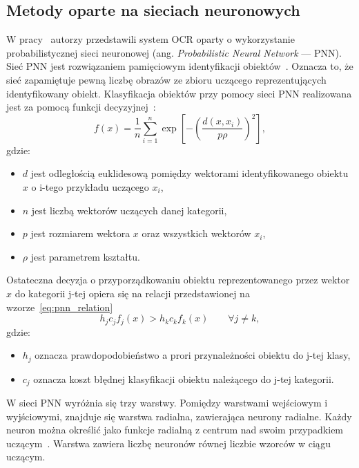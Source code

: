\subsection{Metody oparte na sieciach neuronowych}
\label{subsec:neural_networks}
W pracy~\cite{1688109} autorzy przedstawili system OCR oparty o wykorzystanie probabilistycznej sieci neuronowej (ang. \textit{Probabilistic Neural Network } --- PNN).
Sieć PNN jest rozwiązaniem pamięciowym identyfikacji obiektów~\cite{Praczyk_2011}.
Oznacza to, że sieć zapamiętuje pewną liczbę obrazów ze zbioru uczącego reprezentujących identyfikowany obiekt.
Klasyfikacja obiektów przy pomocy sieci PNN realizowana jest za pomocą funkcji decyzyjnej~\cite{SPECHT1990109}:
\begin{equation}
    \label{eq:pnn_network}
    f(x)=\dfrac{1}{n}\sum_{i=1}^{n}\exp\left[ -\left( \dfrac{d(x,x_i)}{p\rho} \right)^2 \right],
\end{equation}
gdzie:
\begin{itemize}
    \item $d$ jest odległością euklidesową pomiędzy wektorami identyfikowanego obiektu $x$ o i-tego przykładu uczącego $x_i$,
    \item $n$ jest liczbą wektorów uczących danej kategorii,
    \item $p$ jest rozmiarem wektora $x$ oraz wszystkich wektorów $x_i$,
    \item $\rho$ jest parametrem kształtu.
\end{itemize}
Ostateczna decyzja o przyporządkowaniu obiektu reprezentowanego przez wektor $x$ do kategorii j-tej opiera się na relacji przedstawionej na wzorze~\eqref{eq:pnn_relation}~\cite{Praczyk_2011}
\begin{equation}
    \label{eq:pnn_relation}
    h_j c_j f_j(x) > h_k c_k f_k(x) \qquad \forall j\neq k,
\end{equation}
gdzie:
\begin{itemize}
    \item $h_j$ oznacza prawdopodobieństwo a prori przynależności obiektu do j-tej klasy,
    \item $c_j$ oznacza koszt błędnej klasyfikacji obiektu należącego do j-tej kategorii.
\end{itemize}
W sieci PNN wyróżnia się trzy warstwy.
Pomiędzy warstwami wejściowym i wyjściowymi, znajduje się warstwa radialna, zawierająca neurony radialne.
Każdy neuron można określić jako funkcje radialną z centrum nad swoim przypadkiem uczącym~\cite{Praczyk_2011}.
Warstwa zawiera liczbę neuronów równej liczbie wzorców w ciągu uczącym.
